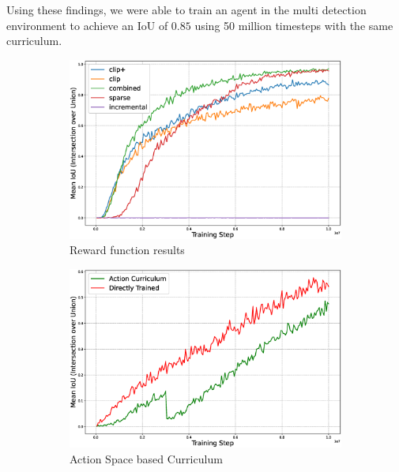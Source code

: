 \documentclass[11pt]{article} %
\begin{document}
Using these findings, we were able to train an agent in the multi detection environment to achieve an IoU of $0.85$ using 50 million timesteps with the same curriculum.

\begin{figure}[h!]
    \begin{subfigure}[b]{0.3\textwidth}
        \includegraphics[width=\textwidth]{figures/plot_reward_funcs_high_res.eps}
        \caption{Reward function results}
        \label{fig:rewards}
    \end{subfigure}
    \hfill
    \begin{subfigure}[b]{0.3\textwidth}
        \includegraphics[width=\textwidth]{figures/plot_action_curr_high_res.eps}
        \caption{Action Space based Curriculum}
        \label{fig:action-curr}
    \end{subfigure}
    \hfill
    \begin{subfigure}[b]{0.3\textwidth}

\end{subfigure}
\end{figure}
\end{document}

